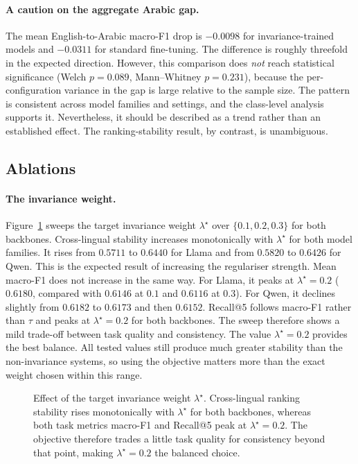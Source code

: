 \paragraph{A caution on the aggregate Arabic gap.}
The mean English-to-Arabic macro-F1 drop is $-0.0098$ for invariance-trained models and $-0.0311$
for standard fine-tuning. The difference is roughly threefold in the expected direction. However,
this comparison does \emph{not} reach statistical significance
(Welch $p = 0.089$, Mann--Whitney $p = 0.231$), because the per-configuration variance in the gap is
large relative to the sample size. The pattern is consistent across model families and settings, and
the class-level analysis supports it. Nevertheless, it should be described as a trend rather than an
established effect. The ranking-stability result, by contrast, is unambiguous.

\subsection{Ablations}
\label{subsec:res-ablations}

\paragraph{The invariance weight.}
Figure~\ref{fig:results-lambda} sweeps the target invariance weight $\lambda^\star$ over
$\{0.1, 0.2, 0.3\}$ for both backbones. Cross-lingual stability increases monotonically with
$\lambda^\star$ for both model families. It rises from $0.5711$ to $0.6440$ for Llama and from
$0.5820$ to $0.6426$ for Qwen. This is the expected result of increasing the regulariser strength.
Mean macro-F1 does not increase in the same way. For Llama, it peaks at $\lambda^\star = 0.2$
($0.6180$, compared with $0.6146$ at $0.1$ and $0.6116$ at $0.3$). For Qwen, it declines slightly
from $0.6182$ to $0.6173$ and then $0.6152$. Recall@5 follows macro-F1 rather than $\tau$ and peaks at
$\lambda^\star = 0.2$ for both backbones. The sweep therefore shows a mild trade-off between task
quality and consistency. The value $\lambda^\star = 0.2$ provides the best balance. All tested values
still produce much greater stability than the non-invariance systems, so using the objective matters
more than the exact weight chosen within this range.

\begin{figure}[htbp]
  \centering
  
  \caption{Effect of the target invariance weight $\lambda^\star$. Cross-lingual ranking stability
  rises monotonically with $\lambda^\star$ for both backbones, whereas both task metrics macro-F1
  and Recall@5 peak at $\lambda^\star = 0.2$. The objective therefore trades a little task quality
  for consistency beyond that point, making $\lambda^\star = 0.2$ the balanced choice.}
  \label{fig:results-lambda}
\end{figure}

